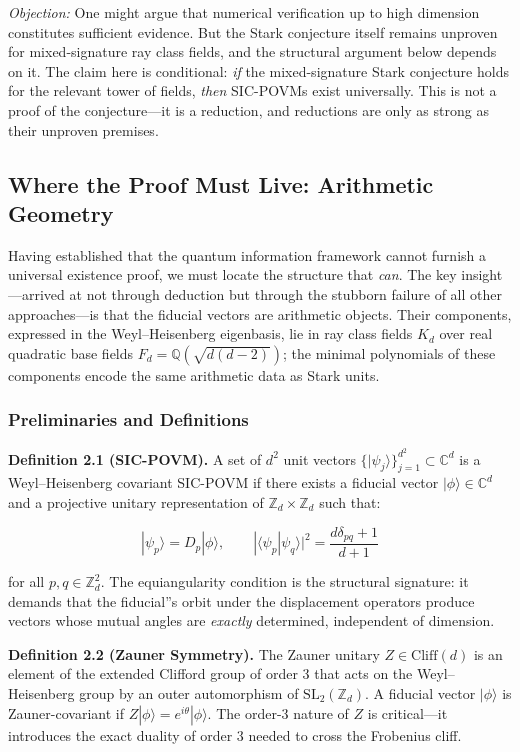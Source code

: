 \documentclass[12pt,a4paper]{article}
\begin{document}
\emph{Objection:} One might argue that numerical verification up to high dimension constitutes sufficient evidence. But the Stark conjecture itself remains unproven for mixed-signature ray class fields, and the structural argument below depends on it. The claim here is conditional: \emph{if} the mixed-signature Stark conjecture holds for the relevant tower of fields, \emph{then} SIC-POVMs exist universally. This is not a proof of the conjecture---it is a reduction, and reductions are only as strong as their unproven premises.

\subsection{Where the Proof Must Live: Arithmetic Geometry}

Having established that the quantum information framework cannot furnish a universal existence proof, we must locate the structure that \emph{can}. The key insight---arrived at not through deduction but through the stubborn failure of all other approaches---is that the fiducial vectors are arithmetic objects. Their components, expressed in the Weyl--Heisenberg eigenbasis, lie in ray class fields $K_d$ over real quadratic base fields $F_d = \mathbb{Q}(\sqrt{d(d-2)})$; the minimal polynomials of these components encode the same arithmetic data as Stark units.

\subsubsection{Preliminaries and Definitions}

\textbf{Definition 2.1 (SIC-POVM).} A set of $d^2$ unit vectors $\{|\psi_j\rangle\}_{j=1}^{d^2} \subset \mathbb{C}^d$ is a Weyl--Heisenberg covariant SIC-POVM if there exists a fiducial vector $|\phi\rangle \in \mathbb{C}^d$ and a projective unitary representation of $\mathbb{Z}_d \times \mathbb{Z}_d$ such that:

\[|\psi_p\rangle = D_p |\phi\rangle, \qquad |\langle\psi_p | \psi_q\rangle|^2 = \frac{d \delta_{pq} + 1}{d+1}\]

for all $p, q \in \mathbb{Z}_d^2$. The equiangularity condition is the structural signature: it demands that the fiducial''s orbit under the displacement operators produce vectors whose mutual angles are \emph{exactly} determined, independent of dimension.

\textbf{Definition 2.2 (Zauner Symmetry).} The Zauner unitary $Z \in \text{Cliff}(d)$ is an element of the extended Clifford group of order 3 that acts on the Weyl--Heisenberg group by an outer automorphism of $\text{SL}_2(\mathbb{Z}_d)$. A fiducial vector $|\phi\rangle$ is Zauner-covariant if $Z|\phi\rangle = e^{i\theta}|\phi\rangle$. The order-3 nature of $Z$ is critical---it introduces the exact duality of order 3 needed to cross the Frobenius cliff.
\end{document}
